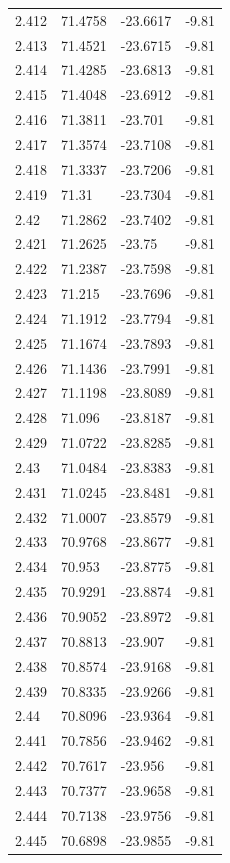 \begin{tabular}{llll}
2.412 & 71.4758 & -23.6617 & -9.81 \\
2.413 & 71.4521 & -23.6715 & -9.81 \\
2.414 & 71.4285 & -23.6813 & -9.81 \\
2.415 & 71.4048 & -23.6912 & -9.81 \\
2.416 & 71.3811 & -23.701 & -9.81 \\
2.417 & 71.3574 & -23.7108 & -9.81 \\
2.418 & 71.3337 & -23.7206 & -9.81 \\
2.419 & 71.31 & -23.7304 & -9.81 \\
2.42 & 71.2862 & -23.7402 & -9.81 \\
2.421 & 71.2625 & -23.75 & -9.81 \\
2.422 & 71.2387 & -23.7598 & -9.81 \\
2.423 & 71.215 & -23.7696 & -9.81 \\
2.424 & 71.1912 & -23.7794 & -9.81 \\
2.425 & 71.1674 & -23.7893 & -9.81 \\
2.426 & 71.1436 & -23.7991 & -9.81 \\
2.427 & 71.1198 & -23.8089 & -9.81 \\
2.428 & 71.096 & -23.8187 & -9.81 \\
2.429 & 71.0722 & -23.8285 & -9.81 \\
2.43 & 71.0484 & -23.8383 & -9.81 \\
2.431 & 71.0245 & -23.8481 & -9.81 \\
2.432 & 71.0007 & -23.8579 & -9.81 \\
2.433 & 70.9768 & -23.8677 & -9.81 \\
2.434 & 70.953 & -23.8775 & -9.81 \\
2.435 & 70.9291 & -23.8874 & -9.81 \\
2.436 & 70.9052 & -23.8972 & -9.81 \\
2.437 & 70.8813 & -23.907 & -9.81 \\
2.438 & 70.8574 & -23.9168 & -9.81 \\
2.439 & 70.8335 & -23.9266 & -9.81 \\
2.44 & 70.8096 & -23.9364 & -9.81 \\
2.441 & 70.7856 & -23.9462 & -9.81 \\
2.442 & 70.7617 & -23.956 & -9.81 \\
2.443 & 70.7377 & -23.9658 & -9.81 \\
2.444 & 70.7138 & -23.9756 & -9.81 \\
2.445 & 70.6898 & -23.9855 & -9.81 \\

\end{tabular}
